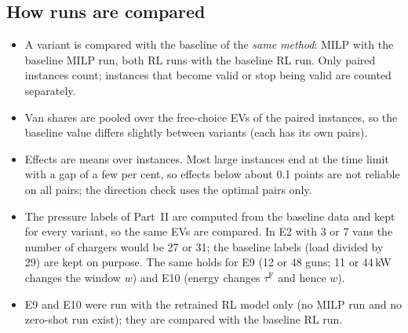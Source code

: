 \subsection{How runs are compared}
\begin{itemize}
  \item A variant is compared with the baseline of the \emph{same method}: MILP with the baseline MILP run, both RL runs with the baseline RL run. Only paired instances count; instances that become valid or stop being valid are counted separately.
  \item Van shares are pooled over the free-choice EVs of the paired instances, so the baseline value differs slightly between variants (each has its own pairs).
  \item Effects are means over instances. Most large instances end at the time limit with a gap of a few per cent, so effects below about 0.1 points are not reliable on all pairs; the direction check uses the optimal pairs only.
  \item The pressure labels of Part~II are computed from the baseline data and kept for every variant, so the same EVs are compared. In E2 with 3 or 7 vans the number of chargers would be 27 or 31; the baseline labels (load divided by 29) are kept on purpose. The same holds for E9 (12 or 48 guns; 11 or 44\,kW changes the window $w$) and E10 (energy changes $\tau^{\mathrm F}$ and hence $w$).
  \item E9 and E10 were run with the retrained RL model only (no MILP run and no zero-shot run exist); they are compared with the baseline RL run.
\end{itemize}

